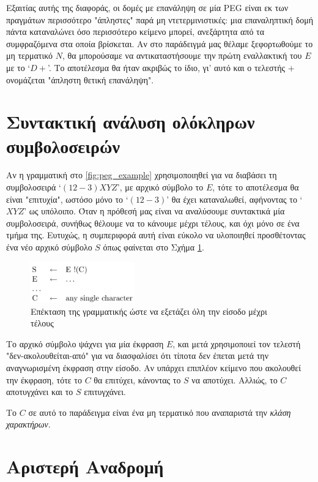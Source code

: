 \documentclass[diploma]{softlab-thesis}
\begin{document}
Εξαιτίας αυτής της διαφοράς, οι δομές με επανάληψη σε μία PEG είναι εκ των πραγμάτων περισσότερο "άπληστες" παρά μη ντετερμινιστικές: μια επαναληπτική δομή πάντα καταναλώνει όσο περισσότερο κείμενο μπορεί, ανεξάρτητα από τα συμφραζόμενα στα οποία βρίσκεται. 
Αν στο παράδειγμά μας θέλαμε ξεφορτωθούμε το μη τερματικό $N$, θα μπορούσαμε να αντικαταστήσουμε την πρώτη εναλλακτική του $E$ με το `$D+$'.
Το αποτέλεσμα θα ήταν ακριβώς το ίδιο, γι' αυτό και ο τελεστής $+$ ονομάζεται "άπληστη θετική επανάληψη".

\section{Συντακτική ανάλυση ολόκληρων συμβολοσειρών}
Αν η γραμματική στο \ref{fig:peg_example} χρησιμοποιηθεί για να διαβάσει τη συμβολοσειρά `$(12-3)XYZ$', με αρχικό σύμβολο το $E$, τότε το αποτέλεσμα θα είναι "επιτυχία", ωστόσο μόνο το `$(12-3)$' θα έχει καταναλωθεί, αφήνοντας το `$XYZ$' ως υπόλοιπο. 
Όταν η πρόθεσή μας είναι να αναλύσουμε συντακτικά μία συμβολοσειρά, συνήθως θέλουμε να το κάνουμε μέχρι τέλους, και όχι μόνο σε ένα τμήμα της.
Ευτυχώς, η συμπεριφορά αυτή είναι εύκολο να υλοποιηθεί προσθέτοντας ένα νέο αρχικό σύμβολο $S$ όπως φαίνεται στο Σχήμα \ref{fig:whole_input}.

\begin{figure}[h]
    \centering
	\includegraphics[width=0.4\textwidth]{pics/whole_input}
	\caption{Επέκταση της γραμματικής ώστε να εξετάζει όλη την είσοδο μέχρι τέλους}
    \label{fig:whole_input}
\end{figure}

Το αρχικό σύμβολο ψάχνει για μία έκφραση $E$, και μετά χρησιμοποιεί τον τελεστή "δεν-ακολουθείται-από" για να διασφαλίσει ότι τίποτα δεν έπεται μετά την αναγνωρισμένη έκφραση στην είσοδο.
Αν υπάρχει επιπλέον κείμενο που ακολουθεί την έκφραση, τότε το $C$ θα επιτύχει, κάνοντας το $S$ να αποτύχει. Αλλιώς, το $C$ αποτυγχάνει και το $S$ επιτυγχάνει.

Το $C$ σε αυτό το παράδειγμα είναι ένα μη τερματικό που αναπαριστά την \textit{κλάση χαρακτήρων}.

\section{Αριστερή Αναδρομή}
\end{document}
